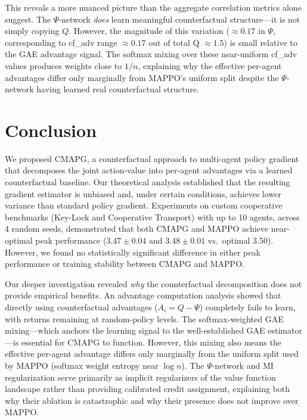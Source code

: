 \documentclass[journal]{IEEEtran}
\begin{document}
This reveals a more nuanced picture than the aggregate correlation metrics alone suggest. The $\Psi$-network \emph{does} learn meaningful counterfactual structure---it is not simply copying $Q$. However, the magnitude of this variation ($\approx 0.17$ in $\Psi$, corresponding to cf\_adv range $\approx 0.17$ out of total Q $\approx 1.5$) is small relative to the GAE advantage signal. The softmax mixing over these near-uniform cf\_adv values produces weights close to $1/n$, explaining why the effective per-agent advantages differ only marginally from MAPPO's uniform split despite the $\Psi$-network having learned real counterfactual structure.

\section{Conclusion}
\label{sec:conclusion}

We proposed CMAPG, a counterfactual approach to multi-agent policy gradient that decomposes the joint action-value into per-agent advantages via a learned counterfactual baseline. Our theoretical analysis established that the resulting gradient estimator is unbiased and, under certain conditions, achieves lower variance than standard policy gradient. Experiments on custom cooperative benchmarks (Key-Lock and Cooperative Transport) with up to 10 agents, across 4 random seeds, demonstrated that both CMAPG and MAPPO achieve near-optimal peak performance ($3.47{\pm}0.04$ and $3.48{\pm}0.01$ vs.\ optimal 3.50). However, we found no statistically significant difference in either peak performance or training stability between CMAPG and MAPPO.

Our deeper investigation revealed \emph{why} the counterfactual decomposition does not provide empirical benefits. An advantage computation analysis showed that directly using counterfactual advantages ($A_i = Q - \Psi$) completely fails to learn, with returns remaining at random-policy levels. The softmax-weighted GAE mixing---which anchors the learning signal to the well-established GAE estimator---is essential for CMAPG to function. However, this mixing also means the effective per-agent advantage differs only marginally from the uniform split used by MAPPO (softmax weight entropy near $\log n$). The $\Psi$-network and MI regularization serve primarily as implicit regularizers of the value function landscape rather than providing calibrated credit assignment, explaining both why their ablation is catastrophic and why their presence does not improve over MAPPO.
\end{document}
